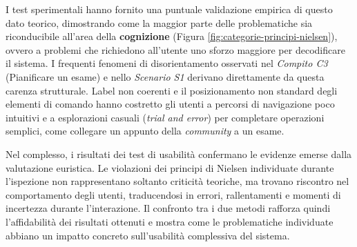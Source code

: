 I test sperimentali hanno fornito una puntuale validazione empirica di questo dato teorico, dimostrando come la maggior parte delle problematiche sia riconducibile all'area della \textbf{cognizione} (Figura \ref{fig:categorie-principi-nielsen}), ovvero a problemi che richiedono all'utente uno sforzo maggiore per decodificare il sistema. I frequenti fenomeni di disorientamento osservati nel \textit{Compito C3} (Pianificare un esame) e nello \textit{Scenario S1} derivano direttamente da questa carenza strutturale. Label non coerenti e il posizionamento non standard degli elementi di comando hanno costretto gli utenti a percorsi di navigazione poco intuitivi e a esplorazioni casuali (\emph{trial and error}) per completare operazioni semplici, come collegare un appunto della \textit{community} a un esame.

Nel complesso, i risultati dei test di usabilità confermano le evidenze emerse dalla valutazione euristica. Le violazioni dei principi di Nielsen individuate durante l'ispezione non rappresentano soltanto criticità teoriche, ma trovano riscontro nel comportamento degli utenti, traducendosi in errori, rallentamenti e momenti di incertezza durante l'interazione. Il confronto tra i due metodi rafforza quindi l'affidabilità dei risultati ottenuti e mostra come le problematiche individuate abbiano un impatto concreto sull'usabilità complessiva del sistema.
